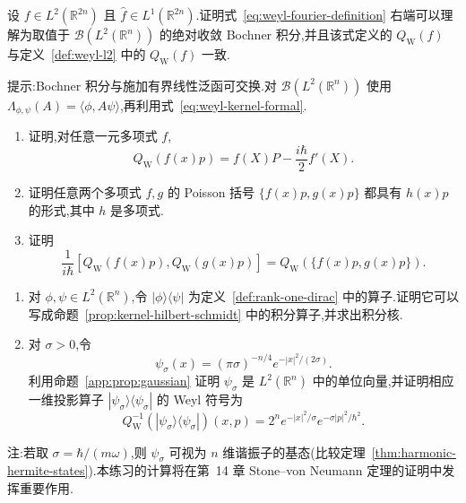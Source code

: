 {\begin{exercise}\label{ex:weyl-fourier-integral}
设 $f\in L^2(\mathbb R^{2n})$ 且 $\widehat f\in L^1(\mathbb R^{2n})$.证明式~\eqref{eq:weyl-fourier-definition} 右端可以理解为取值于 $\mathcal B(L^2(\mathbb R^n))$ 的绝对收敛 Bochner 积分,并且该式定义的 $Q_{\mathrm W}(f)$ 与定义~\ref{def:weyl-l2} 中的 $Q_{\mathrm W}(f)$ 一致.

提示:Bochner 积分与施加有界线性泛函可交换.对 $\mathcal B(L^2(\mathbb R^n))$ 使用 $\Lambda_{\phi,\psi}(A)=\langle\phi,A\psi\rangle$,再利用式~\eqref{eq:weyl-kernel-formal}.
\end{exercise}

\begin{exercise}\label{ex:weyl-linear-momentum-class}
\begin{enumerate}
\item 证明,对任意一元多项式 $f$,
\[
Q_{\mathrm W}(f(x)p)=f(X)P-\frac{i\hbar}{2}f'(X).
\]
\item 证明任意两个多项式 $f,g$ 的 Poisson 括号 $\{f(x)p,g(x)p\}$ 都具有 $h(x)p$ 的形式,其中 $h$ 是多项式.
\item 证明
\[
\frac1{i\hbar}[Q_{\mathrm W}(f(x)p),Q_{\mathrm W}(g(x)p)]
=Q_{\mathrm W}(\{f(x)p,g(x)p\}).
\]
\end{enumerate}
\end{exercise}

\begin{exercise}\label{ex:weyl-rank-one-projection}
\begin{enumerate}
\item 对 $\phi,\psi\in L^2(\mathbb R^n)$,令 $|\phi\rangle\langle\psi|$ 为定义~\ref{def:rank-one-dirac} 中的算子.证明它可以写成命题~\ref{prop:kernel-hilbert-schmidt} 中的积分算子,并求出积分核.
\item 对 $\sigma>0$,令
\[
\psi_\sigma(x)=(\pi\sigma)^{-n/4}e^{-|x|^2/(2\sigma)}.
\]
利用命题~\ref{app:prop:gaussian} 证明 $\psi_\sigma$ 是 $L^2(\mathbb R^n)$ 中的单位向量,并证明相应一维投影算子 $|\psi_\sigma\rangle\langle\psi_\sigma|$ 的 Weyl 符号为
\[
Q_{\mathrm W}^{-1}(|\psi_\sigma\rangle\langle\psi_\sigma|)(x,p)
=2^n e^{-|x|^2/\sigma}e^{-\sigma|p|^2/\hbar^2}.
\]
\end{enumerate}
注:若取 $\sigma=\hbar/(m\omega)$,则 $\psi_\sigma$ 可视为 $n$ 维谐振子的基态(比较定理~\ref{thm:harmonic-hermite-states}).本练习的计算将在第~14 章 Stone--von Neumann 定理的证明中发挥重要作用.
\end{exercise}

}
